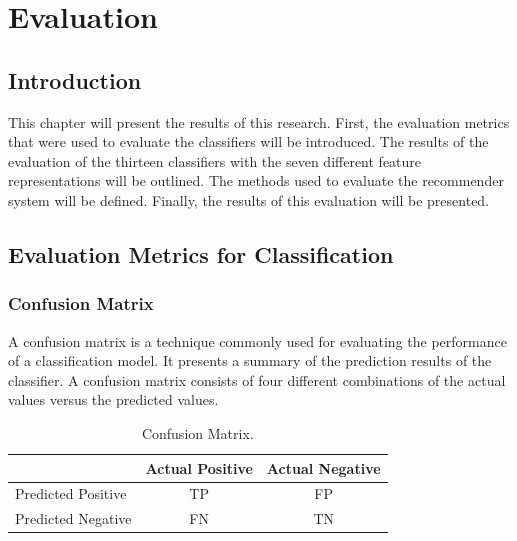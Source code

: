 \chapter{Evaluation}

\section{Introduction}
This chapter will present the results of this research. First, the evaluation metrics that were used to evaluate the classifiers will be introduced. The results of the evaluation of the thirteen classifiers with the seven different feature representations will be outlined. The methods used to evaluate the recommender system will be defined. Finally, the results of this evaluation will be presented. 

\section{Evaluation Metrics for Classification}

\subsection{Confusion Matrix}
A confusion matrix is a technique commonly used for evaluating the performance of a classification model. It presents a summary of the prediction results of the classifier. A confusion matrix consists of four different combinations of the actual values versus the predicted values. 

\begin{table}[h!]
\setlength\extrarowheight{5pt}
\caption{Confusion Matrix.}
\label{Table:confusionmatrix}
\begin{tabular}{c|c|c|}
\cline{2-3}
 & \multicolumn{1}{l|}{Actual Positive} & \multicolumn{1}{l|}{Actual Negative} \\ \hline
\multicolumn{1}{|l|}{Predicted Positive} & TP & FP \\ \hline
\multicolumn{1}{|l|}{Predicted Negative} & FN & TN \\ \hline
\end{tabular}
\end{table}

